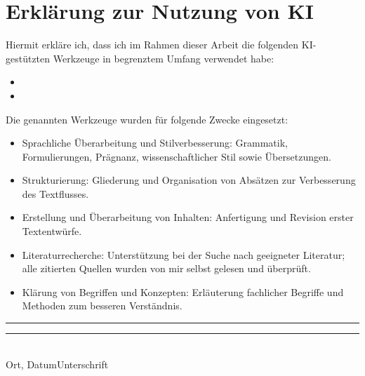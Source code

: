 \section*{\centering Erklärung zur Nutzung von KI}\thispagestyle{plain}\label{ai}

Hiermit erkläre ich, dass ich im Rahmen dieser Arbeit die folgenden KI-gestützten Werkzeuge in begrenztem Umfang verwendet habe:

\begin{itemize}
	\item 
	\item 
\end{itemize}

\vspace{3em}  %
Die genannten Werkzeuge wurden für folgende Zwecke eingesetzt:
\begin{itemize}
	\item Sprachliche Überarbeitung und Stilverbesserung: Grammatik, Formulierungen, Prägnanz, wissenschaftlicher Stil sowie Übersetzungen.
	\item Strukturierung: Gliederung und Organisation von Absätzen zur Verbesserung des Textflusses.
	\item Erstellung und Überarbeitung von Inhalten: Anfertigung und Revision erster Textentwürfe.
	\item Literaturrecherche: Unterstützung bei der Suche nach geeigneter Literatur; alle zitierten Quellen wurden von mir selbst gelesen und überprüft.
	\item Klärung von Begriffen und Konzepten: Erläuterung fachlicher Begriffe und Methoden zum besseren Verständnis.
\end{itemize}

\vspace{2.5cm}
\rule{5cm}{0.2pt}\hfill\rule{5cm}{0.2pt}\\
\footnotesize\phantom{}\hspace{17mm} Ort, Datum\hfill Unterschrift\hspace{17mm}
\clearpage\normalsize

\clearpage